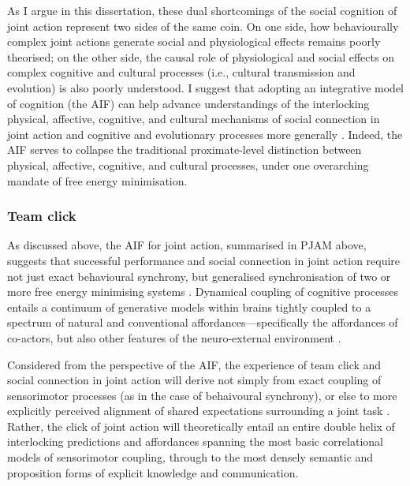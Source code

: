 \begin{CJK}{UTF8}{gbsn}
As I argue in this dissertation, these dual shortcomings of the social cognition of joint action represent two sides of the same coin. On one side, how behaviourally complex joint actions generate social and physiological effects remains poorly theorised; on the other side, the causal role of physiological and social effects on complex cognitive and cultural processes (i.e., cultural transmission and evolution) is also poorly understood.  I suggest that adopting an integrative model of cognition (the AIF) can help advance understandings of the interlocking physical, affective, cognitive, and cultural mechanisms of social connection in joint action and cognitive and evolutionary processes more generally \citep{Ramstead2018}. Indeed, the AIF serves to collapse the traditional proximate-level distinction between physical, affective, cognitive, and cultural processes, under one overarching mandate of free energy minimisation.

\subsubsection{Team click}
As discussed above, the AIF for joint action, summarised in PJAM above, suggests that successful performance and social connection in joint action require not just exact behavioural synchrony, but generalised synchronisation of two or more free energy minimising systems \citep{Friston2015}.  Dynamical coupling of cognitive processes entails a continuum of generative models within brains tightly coupled to a spectrum of natural and conventional affordances---specifically the affordances of co-actors, but also other features of the neuro-external environment \citep{Clark2015}.

Considered from the perspective of the AIF, the experience of team click and social connection in joint action will derive not simply from exact coupling of sensorimotor processes (as in the case of behaivoural synchrony), or else to more explicitly perceived alignment of shared expectations surrounding a joint task \citep[cf.][]{VanderWel2012}. Rather, the click of joint action will theoretically entail an entire double helix of interlocking predictions and affordances spanning the most basic correlational models of sensorimotor coupling, through to the most densely semantic and proposition forms of explicit knowledge and communication.


\end{CJK}
